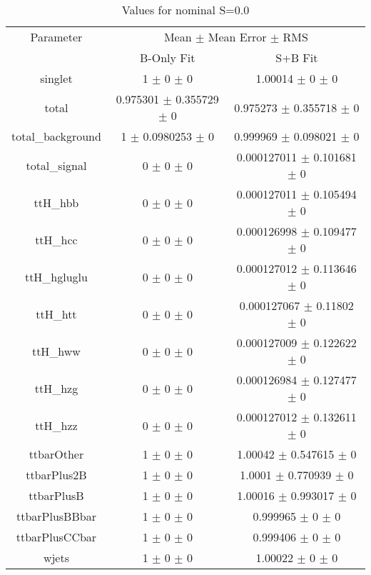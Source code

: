 \begin{table}
\centering
\caption{Values for nominal S=0.0}
\begin{tabular}{ccc}
\toprule
Parameter & \multicolumn{2}{c}{Mean $\pm$ Mean Error $\pm$ RMS}\\
 & B-Only Fit & S+B Fit\\
\midrule
singlet & \num{1} $\pm$ \num{0} $\pm$ \num{0} & \num{1.00014} $\pm$ \num{0} $\pm$ \num{0}\\
total & \num{0.975301} $\pm$ \num{0.355729} $\pm$ \num{0} & \num{0.975273} $\pm$ \num{0.355718} $\pm$ \num{0}\\
total\_background & \num{1} $\pm$ \num{0.0980253} $\pm$ \num{0} & \num{0.999969} $\pm$ \num{0.098021} $\pm$ \num{0}\\
total\_signal & \num{0} $\pm$ \num{0} $\pm$ \num{0} & \num{0.000127011} $\pm$ \num{0.101681} $\pm$ \num{0}\\
ttH\_hbb & \num{0} $\pm$ \num{0} $\pm$ \num{0} & \num{0.000127011} $\pm$ \num{0.105494} $\pm$ \num{0}\\
ttH\_hcc & \num{0} $\pm$ \num{0} $\pm$ \num{0} & \num{0.000126998} $\pm$ \num{0.109477} $\pm$ \num{0}\\
ttH\_hgluglu & \num{0} $\pm$ \num{0} $\pm$ \num{0} & \num{0.000127012} $\pm$ \num{0.113646} $\pm$ \num{0}\\
ttH\_htt & \num{0} $\pm$ \num{0} $\pm$ \num{0} & \num{0.000127067} $\pm$ \num{0.11802} $\pm$ \num{0}\\
ttH\_hww & \num{0} $\pm$ \num{0} $\pm$ \num{0} & \num{0.000127009} $\pm$ \num{0.122622} $\pm$ \num{0}\\
ttH\_hzg & \num{0} $\pm$ \num{0} $\pm$ \num{0} & \num{0.000126984} $\pm$ \num{0.127477} $\pm$ \num{0}\\
ttH\_hzz & \num{0} $\pm$ \num{0} $\pm$ \num{0} & \num{0.000127012} $\pm$ \num{0.132611} $\pm$ \num{0}\\
ttbarOther & \num{1} $\pm$ \num{0} $\pm$ \num{0} & \num{1.00042} $\pm$ \num{0.547615} $\pm$ \num{0}\\
ttbarPlus2B & \num{1} $\pm$ \num{0} $\pm$ \num{0} & \num{1.0001} $\pm$ \num{0.770939} $\pm$ \num{0}\\
ttbarPlusB & \num{1} $\pm$ \num{0} $\pm$ \num{0} & \num{1.00016} $\pm$ \num{0.993017} $\pm$ \num{0}\\
ttbarPlusBBbar & \num{1} $\pm$ \num{0} $\pm$ \num{0} & \num{0.999965} $\pm$ \num{0} $\pm$ \num{0}\\
ttbarPlusCCbar & \num{1} $\pm$ \num{0} $\pm$ \num{0} & \num{0.999406} $\pm$ \num{0} $\pm$ \num{0}\\
wjets & \num{1} $\pm$ \num{0} $\pm$ \num{0} & \num{1.00022} $\pm$ \num{0} $\pm$ \num{0}\\
\bottomrule
\end{tabular}
\end{table}
